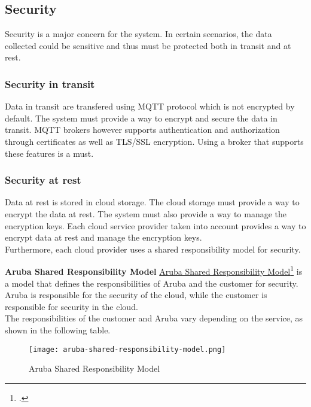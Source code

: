 \subsection{Security}
Security is a major concern for the system. In certain scenarios, the data collected could be sensitive and thus must be protected both in transit and at rest.
    \subsubsection{Security in transit}
    Data in transit are transfered using MQTT protocol which is not encrypted by default. The system must provide a way to encrypt and secure the data in transit. MQTT brokers however supports authentication and authorization through certificates as well as TLS/SSL encryption. Using a broker that supports these features is a must.
    
    \subsubsection{Security at rest}
    Data at rest is stored in cloud storage. The cloud storage must provide a way to encrypt the data at rest. The system must also provide a way to manage the encryption keys. Each cloud service provider taken into account provides a way to encrypt data at rest and manage the encryption keys.\\ 
    Furthermore, each cloud provider uses a shared responsibility model for security.
    
    \newpage
    \textbf{Aruba Shared Responsibility Model}
    \href{https://kb.arubacloud.com/en/computing/use-and-technology/shared-responsibility-model.aspx}{Aruba Shared Responsibility Model}\footcite{site:aruba-shared-responsibility-model} is a model that defines the responsibilities of Aruba and the customer for security. Aruba is responsible for the security of the cloud, while the customer is responsible for security in the cloud.\\ The responsibilities of the customer and Aruba vary depending on the service, as shown in the following table.\\ 
    \begin{figure}[htbp]
        \centering
        \texttt{[image: aruba-shared-responsibility-model.png]}
        \caption{Aruba Shared Responsibility Model}
    \end{figure}

